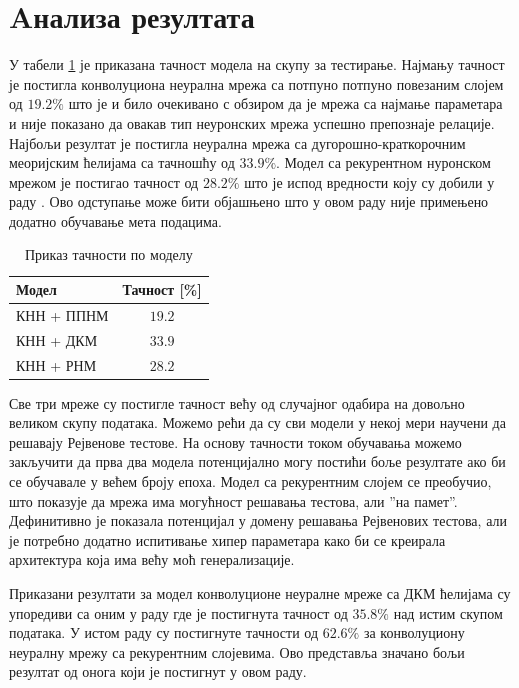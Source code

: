 \documentclass[a4paper, 12pt, master, utf8]{etf}
\begin{document}
\section{Aнализа резултата}

У табели \ref{tab:pr} је приказана тачност модела на скупу за тестирање. 
Најмању тачност је постигла конволуциона неурална мрежа са потпуно потпуно повезаним слојем од $19.2 \%$ што је и било очекивано с обзиром 
да је мрежа са најмање параметара и није показано да овакав тип неуронских мрежа успешно препознаје релације.
Најбољи резултат је постигла неурална мрежа са дугорошно-краткорочним меоријским ћелијама са тачношћу од $33.9 \%$. 
Модел са рекурентном нуронском мрежом је постигао тачност од $28.2 \%$ што је испод вредности коју су добили у раду \cite{barrett_measuring_2018}.
Ово одступање може бити објашњено што у овом раду није примењено додатно обучавање мета подацима.
\newline

\begin{table}[h]
    \centering
    \begin{tabular}{l | c}
    \hline
    Модел & Тачност [\%]\\
    \hline
        КНН + ППНМ &$ 19.2$\\
        КНН + ДКМ & $ 33.9$\\
        КНН + РНМ & $28.2 $\\
    \end{tabular}
    \caption{Приказ тачности по моделу}
    \label{tab:pr}
\end{table}

Све три мреже су постигле тачност већу од случајног одабира на довољно великом скупу података. Можемо рећи да су сви модели у некој мери научени да решавају Рејвенове тестове.
На основу тачности током обучавања можемо закључити да прва два модела потенцијално могу постићи боље резултате ако би се обучавале у већем броју епоха.
Модел са рекурентним слојем се преобучио, што показује да мрежа има могућност решавања тестова, али ”на памет”. Дефинитивно је показала потенцијал у домену решавања Рејвенових тестова, али 
је потребно додатно испитивање хипер параметара како би се креирала архитектура која има већу моћ генерализације.
\newline

Приказани резултати за модел конволуционе неуралне мреже са ДКМ ћелијама су упоредиви са оним у раду \cite{barrett_measuring_2018} где је постигнута тачност од $35.8\%$ над истим скупом података.
У истом раду су постигнуте тачности од $62.6\%$ за конволуциону неуралну мрежу са рекурентним слојевима. Ово представља значано бољи резултат од онога који је постигнут у овом раду. 
\end{document}
